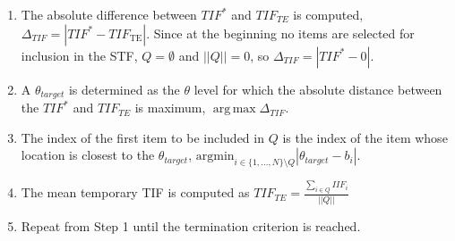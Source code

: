 \documentclass[12pt, a4paper, titilepage]{article}
\DeclareMathOperator*{\argmax}{arg\,max}
\begin{document}
\begin{enumerate}
\item  The absolute difference between $\mathit{TIF}^*$ and $TIF_{TE}$ is computed, $\Delta_{TIF} = |TIF^* - TIF_{\text{TE}}|$. Since at the beginning no items are selected for inclusion in the STF, $Q = \emptyset$ and $||Q|| =0$, so $\Delta_{TIF} = |TIF^* - 0|$. 
	
\item  A $\theta_{target}$ is determined as the $\theta$ level for which the absolute distance between the $\mathit{TIF}^*$ and $\mathit{TIF}_{TE}$ is maximum, $\argmax{\Delta_{TIF}}$. %
	
\item  The index of the first item to be included in $Q$ is the index of the item whose location is closest to the $\theta_{target}$, $\text{argmin}_{i \in \{1, \ldots, N\}\setminus Q} |\theta_{target} -b_i|$.
	
\item  The mean temporary TIF is computed as $TIF_{TE} = \frac{\sum_{i\in Q} IIF_i}{||Q||}$
	
\item  Repeat from Step 1 until the termination criterion is reached.
\end{enumerate}




%
\end{document}
